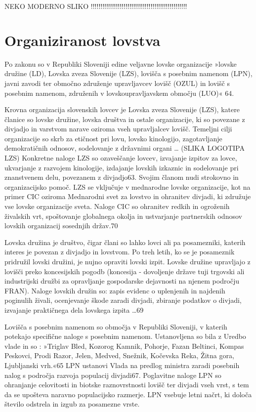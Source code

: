 \documentclass[a4paper,12pt,openright]{book}
\begin{document}
NEKO MODERNO SLIKO !!!!!!!!!!!!!!!!!!!!!!!!!!!!!!!!!!!!!!!!!!!!!!!!!!

\section{Organiziranost lovstva}

Po zakonu so v Republiki Sloveniji edine veljavne lovske organizacije »lovske družine (LD), Lovska zveza Slovenije (LZS), lovišča s posebnim namenom (LPN), javni zavodi ter območno združenje upravljavcev lovišč (OZUL) in lovišč s posebnim namenom, združenih v lovskoupravljavskem območju (LUO)« {64}. 

Krovna organizacija slovenskih lovcev je Lovska zveza Slovenije (LZS), katere članice so lovske družine, lovska društva in ostale organizacije, ki so povezane z divjadjo in varstvom narave oziroma vseh upravljalcev lovišč. 
Temeljni cilji organizacije so skrb za etičnost pri lovu, lovsko kinologijo, zagotavljanje demokratičnih odnosov, sodelovanje z državnimi organi … 
(SLIKA LOGOTIPA LZS)
Konkretne naloge LZS so ozaveščanje lovcev, izvajanje izpitov za lovce, ukvarjanje z razvojem kinologije, izdajanje lovskih izkaznic in sodelovanje pri znanstvenem delu, povezanem z divjadjo{63}. 
Svojim članom nudi strokovno in organizacijsko pomoč. 
LZS se vključuje v mednarodne lovske organizacije, kot na primer CIC oziroma Mednarodni svet za lovstvo in ohranitev divjadi, ki združuje vse lovske organizacije sveta.
Naloge CIC so ohranitev redkih in ogroženih živalskih vrt, spoštovanje globalnega okolja in ustvarjanje partnerskih odnosov lovskih organizacij sosednjih držav.{70} 
 
Lovska družina je društvo, čigar člani so lahko lovci ali pa posamezniki, katerih interes je povezan z divjadjo in lovstvom. 
Po treh letih, ko se je posameznik pridružil lovski družini, je nujno opraviti lovski izpit.
Lovske družine upravljajo z lovišči preko koncesijskih pogodb (koncesija - dovoljenje države tuji trgovski ali industrijski družbi za opravljanje gospodarske dejavnosti na njenem področju FRAN).
Naloge lovskih družin so: zapis evidenc o uplenjenih in najdenih poginulih živali, ocenjevanje škode zaradi divjadi, zbiranje podatkov o divjadi, izvajanje praktičnega dela lovskega izpita …{69} 
 
Lovišča s posebnim namenom so območja v Republiki Sloveniji, v katerih potekajo specifične naloge s posebnim namenom.
Ustanovljena so bila z Uredbo vlade in so : »Triglav Bled, Kozorog Kamnik, Pohorje, Fazan Beltinci, Kompas Peskovci, Prodi Razor, Jelen, Medved, Snežnik, Kočevska Reka, Žitna gora, Ljubljanski vrh.«{65}
LPN ustanovi Vlada na predlog ministra zaradi posebnih nalog s področja razvoja populacij divjadi{67}. 
Poglavitne naloge LPN so ohranjanje celovitosti in biotske raznovrstnosti lovišč ter divjadi vseh vrst, s tem da se upošteva naravno populacijsko razmerje. 
LPN vsebuje letni načrt, ki določa število odstrela in izgub za posamezne vrste.
\end{document}
